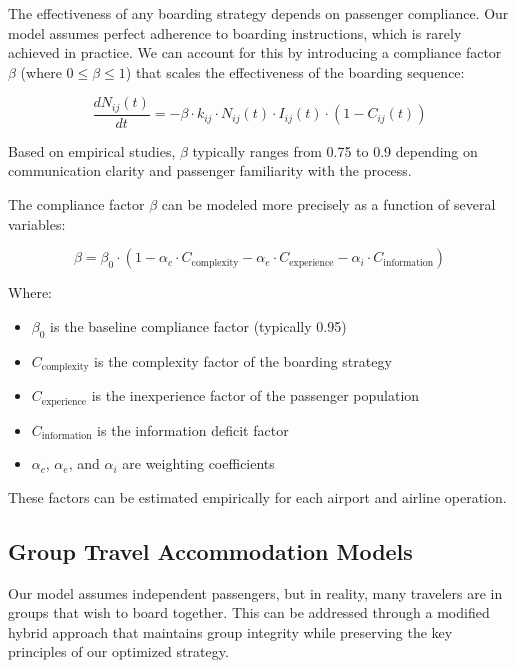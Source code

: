 \documentclass[12pt]{article}
\begin{document}
The effectiveness of any boarding strategy depends on passenger compliance. Our model assumes perfect adherence to boarding instructions, which is rarely achieved in practice. We can account for this by introducing a compliance factor $\beta$ (where $0 \leq \beta \leq 1$) that scales the effectiveness of the boarding sequence:

\begin{equation}
\frac{dN_{ij}(t)}{dt} = -\beta \cdot k_{ij} \cdot N_{ij}(t) \cdot I_{ij}(t) \cdot (1 - C_{ij}(t))
\end{equation}

Based on empirical studies, $\beta$ typically ranges from 0.75 to 0.9 depending on communication clarity and passenger familiarity with the process.

The compliance factor $\beta$ can be modeled more precisely as a function of several variables:

\begin{equation}
\beta = \beta_0 \cdot (1 - \alpha_c \cdot C_{\text{complexity}} - \alpha_e \cdot C_{\text{experience}} - \alpha_i \cdot C_{\text{information}})
\end{equation}

Where:
\begin{itemize}
    \item $\beta_0$ is the baseline compliance factor (typically 0.95)
    \item $C_{\text{complexity}}$ is the complexity factor of the boarding strategy
    \item $C_{\text{experience}}$ is the inexperience factor of the passenger population
    \item $C_{\text{information}}$ is the information deficit factor
    \item $\alpha_c$, $\alpha_e$, and $\alpha_i$ are weighting coefficients
\end{itemize}

These factors can be estimated empirically for each airport and airline operation.

\subsection{Group Travel Accommodation Models}

Our model assumes independent passengers, but in reality, many travelers are in groups that wish to board together. This can be addressed through a modified hybrid approach that maintains group integrity while preserving the key principles of our optimized strategy.
\end{document}

